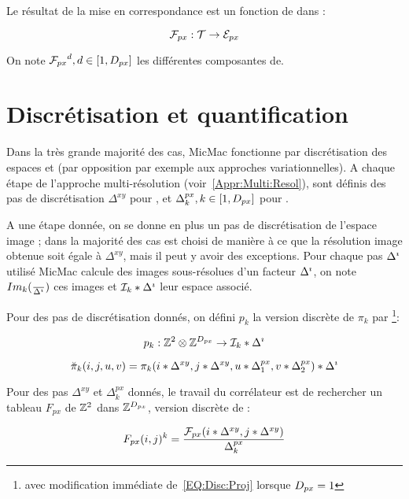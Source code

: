 Le r\'esultat de la mise en correspondance est un fonction  \FPx de
\ETer dans \EPx:

\begin{equation}
   \FPx :   \ETer  \rightarrow  \EPx 
\end{equation}

On note ${\FPx}^d,d\in [1,\DimPx]$ les diff\'erentes composantes de\FPx.



\section{Discr\'etisation et quantification}

\label{Disc:Quant}

Dans la tr\`es grande majorit\'e des cas,
MicMac  fonctionne par discr\'etisation 
des espaces \ETer et \EPx (par opposition par exemple aux
approches variationnelles). A chaque \'etape
de l'approche multi-r\'esolution (voir~\ref{Appr:Multi:Resol}), sont 
d\'efinis des pas de discr\'etisation  $\Delta^{xy}$ pour \ETer , 
et $\Delta^{px}_k, k \in [1,\DimPx]$ pour  \EPx.

A une \'etape donn\'ee, on se donne en plus un pas de
discr\'etisation de l'espace image \DeltaI; dans
la  majorit\'e des cas \DeltaI est choisi
de mani\`ere \`a ce que la r\'esolution image obtenue soit
\'egale \`a  $\Delta^{xy}$,
mais il peut y avoir des exceptions. Pour chaque pas $\DeltaI$
utilis\'e MicMac calcule des images sous-r\'esolues d'un facteur
$\DeltaI$, on note $Im_k(\frac{}{\DeltaI})$ ces images et 
$\EIm*\DeltaI$ leur espace associ\'e.


Pour des pas de discr\'etisation donn\'es,
on d\'efini $p_k$ la version discr\`ete de $\pi_k$ par 
\footnote{avec modification imm\'ediate de~\ref{EQ:Disc:Proj} 
lorsque $\DimPx=1$}:

\begin{equation}
   p_k : \ZZ^2 \otimes\ZZ^{\DimPx} \rightarrow \EIm*\DeltaI
\end{equation}

\begin{equation}
   \breve\pi_k(i,j,u,v) = \pi_k(i*\Delta^{xy},j*\Delta^{xy},u*\Delta^{px}_1,v*\Delta^{px}_2)*\DeltaI
\label{EQ:Disc:Proj}
\end{equation}

Pour des pas   $\Delta^{xy}$ et $\Delta^{px}_k$ donn\'es, le travail
du corr\'elateur est de rechercher un tableau $F_{px}$ de $\ZZ^2$ dans
$\ZZ^{\DimPx}$, version discr\`ete de \FPx:

\begin{equation}
   F_{px}(i,j)^k = \frac{\FPx(i*\Delta^{xy},j*\Delta^{xy})}{\Delta^{px}_k}
\end{equation}


